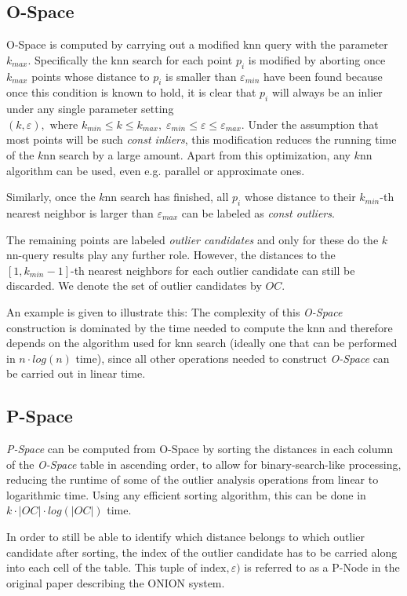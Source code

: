 \documentclass[runningheads]{llncs}
\begin{document}
\subsection{O-Space}
O-Space is computed by carrying out a modified knn query with the parameter $k_{max}$. Specifically  the knn search for each point $p_i$ is modified by aborting once $k_{max}$ points whose distance to $p_i$ is smaller than $\varepsilon_{min}$ have been found because once this condition is known to hold, it is clear that $p_i$ will always be an inlier under any single parameter setting $(k,\varepsilon), \text{ where } k_{min}\leq k \leq k_{max},\; \varepsilon_{min}\leq \varepsilon \leq \varepsilon_{max}$. Under the assumption that most points will be such \emph{const inliers}, this modification reduces the running time of the $k$nn search by a large amount. Apart from this optimization, any $k$nn algorithm can be used, even e.g. parallel or approximate ones.

Similarly, once the $k$nn search has finished, all $p_i$ whose distance to their $k_{min}$-th nearest neighbor is larger than $\varepsilon_{max}$ can be labeled as \emph{const outliers}.

The remaining points are labeled \emph{outlier candidates} and only for these do the $k$nn-query results play any further role.  However, the distances to the $[1,k_{min}-1]$-th nearest neighbors for each outlier candidate can still be discarded. We denote the set of outlier candidates by $OC$.

An example is given to illustrate this:
The complexity of this \emph{O-Space} construction is dominated by the time needed to compute the knn and therefore depends on the algorithm used for knn search (ideally one that can be performed in $n \cdot log(n)$ time), since all other operations needed to construct \emph{O-Space} can be carried out in linear time.
\subsection{P-Space}
\emph{P-Space} can be computed from O-Space by sorting the distances in each column of the \emph{O-Space} table in ascending order, to allow for binary-search-like processing, reducing the runtime of some of the outlier analysis operations from linear to logarithmic time. Using any efficient sorting algorithm, this can be done in $k \cdot |OC| \cdot log(|OC|)$ time. 

In order to still be able to identify which distance belongs to which outlier candidate after sorting, the index of the outlier candidate has to be carried along into each cell of the table. This tuple of $\text{index},\varepsilon)$ is referred to as a P-Node in the original paper\cite{onion} describing the ONION system.
\end{document}
